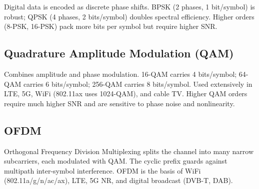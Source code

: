 Digital data is encoded as discrete phase shifts. BPSK (2 phases, 1 bit/symbol) is robust; QPSK (4 phases, 2 bits/symbol) doubles spectral efficiency. Higher orders (8-PSK, 16-PSK) pack more bits per symbol but require higher SNR.

				

\subsection{Quadrature Amplitude Modulation (QAM)}

				

Combines amplitude and phase modulation. 16-QAM carries 4 bits/symbol; 64-QAM carries 6 bits/symbol; 256-QAM carries 8 bits/symbol. Used extensively in LTE, 5G, WiFi (802.11ax uses 1024-QAM), and cable TV. Higher QAM orders require much higher SNR and are sensitive to phase noise and nonlinearity.

				

\subsection{OFDM}

				

Orthogonal Frequency Division Multiplexing splits the channel into many narrow subcarriers, each modulated with QAM. The cyclic prefix guards against multipath inter-symbol interference. OFDM is the basis of WiFi (802.11a/g/n/ac/ax), LTE, 5G NR, and digital broadcast (DVB-T, DAB).



